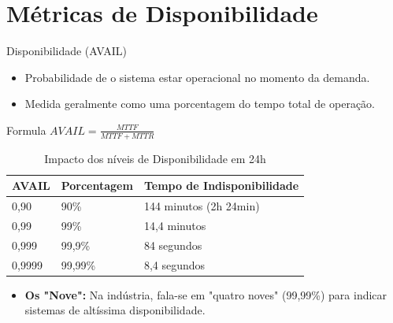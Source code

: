 \documentclass[9pt]{beamer}
\begin{document}
\section{Métricas de Disponibilidade}
\begin{frame}{Disponibilidade (AVAIL)}
    \begin{itemize}
        \item Probabilidade de o sistema estar operacional no momento da demanda.
        \item Medida geralmente como uma porcentagem do tempo total de operação.
    \end{itemize}
    \begin{exampleblock}{Formula}
        $AVAIL = \frac{MTTF}{MTTF + MTTR}$ \\
      \end{exampleblock}
    \begin{table}[]
        \centering
        \small
        \caption{Impacto dos níveis de Disponibilidade em 24h}
        \begin{tabular}{|l|l|l|}
        \hline
        \textbf{AVAIL} & \textbf{Porcentagem} & \textbf{Tempo de Indisponibilidade} \\ \hline
        0,90           & 90\%                 & 144 minutos (2h 24min)             \\ \hline
        0,99           & 99\%                 & 14,4 minutos                       \\ \hline
        0,999          & 99,9\%               & 84 segundos                        \\ \hline
        0,9999         & 99,99\%              & 8,4 segundos                       \\ \hline
        \end{tabular}
    \end{table}

    \begin{itemize}
        \item \textbf{Os "Nove":} Na indústria, fala-se em "quatro noves" (99,99\%) para indicar sistemas de altíssima disponibilidade.
    \end{itemize}
\end{frame}
\end{document}
